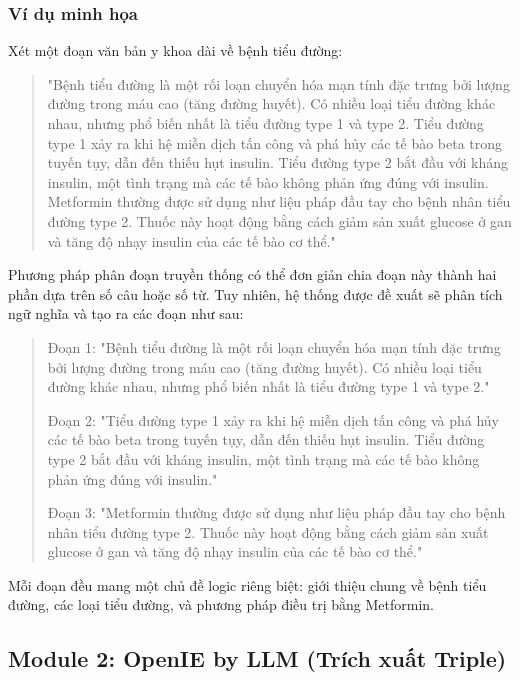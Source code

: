 \subsubsection{Ví dụ minh họa}
Xét một đoạn văn bản y khoa dài về bệnh tiểu đường:

\begin{quote}
"Bệnh tiểu đường là một rối loạn chuyển hóa mạn tính đặc trưng bởi lượng đường trong máu cao (tăng đường huyết). Có nhiều loại tiểu đường khác nhau, nhưng phổ biến nhất là tiểu đường type 1 và type 2. Tiểu đường type 1 xảy ra khi hệ miễn dịch tấn công và phá hủy các tế bào beta trong tuyến tụy, dẫn đến thiếu hụt insulin. Tiểu đường type 2 bắt đầu với kháng insulin, một tình trạng mà các tế bào không phản ứng đúng với insulin. Metformin thường được sử dụng như liệu pháp đầu tay cho bệnh nhân tiểu đường type 2. Thuốc này hoạt động bằng cách giảm sản xuất glucose ở gan và tăng độ nhạy insulin của các tế bào cơ thể."
\end{quote}

Phương pháp phân đoạn truyền thống có thể đơn giản chia đoạn này thành hai phần dựa trên số câu hoặc số từ. Tuy nhiên, hệ thống được đề xuất sẽ phân tích ngữ nghĩa và tạo ra các đoạn như sau:

\begin{quote}
Đoạn 1: "Bệnh tiểu đường là một rối loạn chuyển hóa mạn tính đặc trưng bởi lượng đường trong máu cao (tăng đường huyết). Có nhiều loại tiểu đường khác nhau, nhưng phổ biến nhất là tiểu đường type 1 và type 2."

Đoạn 2: "Tiểu đường type 1 xảy ra khi hệ miễn dịch tấn công và phá hủy các tế bào beta trong tuyến tụy, dẫn đến thiếu hụt insulin. Tiểu đường type 2 bắt đầu với kháng insulin, một tình trạng mà các tế bào không phản ứng đúng với insulin."

Đoạn 3: "Metformin thường được sử dụng như liệu pháp đầu tay cho bệnh nhân tiểu đường type 2. Thuốc này hoạt động bằng cách giảm sản xuất glucose ở gan và tăng độ nhạy insulin của các tế bào cơ thể."
\end{quote}

Mỗi đoạn đều mang một chủ đề logic riêng biệt: giới thiệu chung về bệnh tiểu đường, các loại tiểu đường, và phương pháp điều trị bằng Metformin.

\subsection{Module 2: OpenIE by LLM (Trích xuất Triple)}

